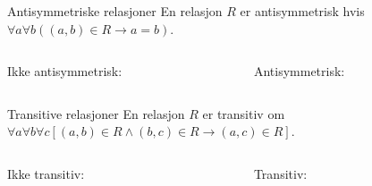 \begin{frame}[fragile]{Antisymmetriske relasjoner}
En relasjon $R$ er antisymmetrisk hvis $\forall a \forall b ((a, b) \in R \rightarrow a = b)$.\\
    \begin{columns}
        \begin{column}{0.3\textwidth}
        Ikke antisymmetrisk:
        \end{column}
        \begin{column}{0.3\textwidth}
Antisymmetrisk:
        \end{column}
    \end{columns}
\end{frame}

\begin{frame}[fragile]{Transitive relasjoner}
En relasjon $R$ er transitiv om $\forall a \forall b \forall c [(a, b) \in R \land (b, c) \in R \rightarrow (a, c) \in R]$.\\
    \begin{columns}
        \begin{column}{0.3\textwidth}
        Ikke transitiv:
        \end{column}
        \begin{column}{0.3\textwidth}
Transitiv:
        \end{column}
    \end{columns}
\end{frame}

